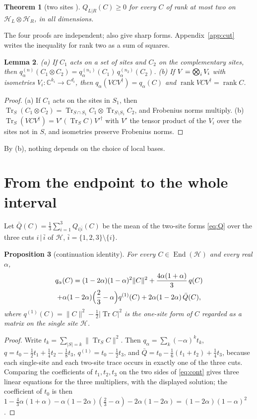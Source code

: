 \documentclass[aps,pra,twocolumn,superscriptaddress,nofootinbib,longbibliography]{revtex4-2}
\newcommand{\C}{\mathbb C}
\newcommand{\Hh}{\mathcal H}
\DeclareMathOperator{\Tr}{Tr}
\DeclareMathOperator{\rank}{rank}
\DeclareMathOperator{\End}{End}
\theoremstyle{plain}
\newtheorem{theorem}{Theorem}[section]
\newtheorem{lemma}[theorem]{Lemma}
\newtheorem{proposition}[theorem]{Proposition}
\theoremstyle{definition}
\theoremstyle{remark}
\begin{document}
\begin{theorem}[two sites \cite{FuGaoPark,SongChen,FHPV,BGH}]\label{thm:twocopy}
$Q_{L|R}(C)\ge0$ for every $C$ of rank at most two on $\Hh_L\otimes\Hh_R$, in all dimensions.
\end{theorem}

The four proofs are independent; \cite{FHPV,BGH} also give sharp forms. Appendix~\ref{app:cut} writes the inequality for rank two as a sum of squares.

\begin{lemma}\label{lem:elementary}
\textup{(a)} If $C_1$ acts on a set of sites and $C_2$ on the complementary sites, then $q^{(n)}_\alpha(C_1\otimes C_2)=q^{(n_1)}_\alpha(C_1)\,q^{(n_2)}_\alpha(C_2)$.
\textup{(b)} If $V=\bigotimes_{i\vphantom{y}}V_i$ with isometries $V_i:\C^{k_i}\to\C^{d_i}$, then $q_\alpha(VCV^\dagger)=q_\alpha(C)$ and $\rank VCV^\dagger=\rank C$.
\end{lemma}
\begin{proof}
(a) If $C_1$ acts on the sites in $S_1$, then $\Tr_S(C_1\otimes C_2)=\Tr_{S\cap S_1}C_1\otimes\Tr_{S\setminus S_1}C_2$, and Frobenius norms multiply. (b) $\Tr_S(VCV^\dagger)=V'(\Tr_SC)V'^\dagger$ with $V'$ the tensor product of the $V_i$ over the sites not in $S$, and isometries preserve Frobenius norms.
\end{proof}

By (b), nothing depends on the choice of local bases.

\section{From the endpoint to the whole interval}\label{sec:interval}

Let $\bar Q(C)=\tfrac13\sum_{i=1}^3Q_{i|\bar i}(C)$ be the mean of the two-site forms \eqref{eq:Q} over the three cuts $i\,|\,\bar i$ of $\Hh$, $\bar i=\{1,2,3\}\setminus\{i\}$.

\begin{proposition}[continuation identity]\label{prop:cont}
For every $C\in\End(\Hh)$ and every real $\alpha$,
\begin{multline}\label{eq:cont}
q_\alpha(C)=(1-2\alpha)(1-\alpha)^2\|C\|^2+\frac{4\alpha(1+\alpha)}3\,q(C)\\
+\alpha(1-2\alpha)\Bigl(\frac23-\alpha\Bigr)q^{(1)}(C)+2\alpha(1-2\alpha)\,\bar Q(C),
\end{multline}
where $q^{(1)}(C)=\|C\|^2-\tfrac12|\Tr C|^2$ is the one-site form of $C$ regarded as a matrix on the single site $\Hh$.
\end{proposition}
\begin{proof}
Write $t_k=\sum_{|S|=k}\|\Tr_SC\|^2$. Then $q_\alpha=\sum_k(-\alpha)^kt_k$, $q=t_0-\tfrac12t_1+\tfrac14t_2-\tfrac18t_3$, $q^{(1)}=t_0-\tfrac12t_3$, and $\bar Q=t_0-\tfrac16(t_1+t_2)+\tfrac14t_3$, because each single-site and each two-site trace occurs in exactly one of the three cuts. Comparing the coefficients of $t_1,t_2,t_3$ on the two sides of \eqref{eq:cont} gives three linear equations for the three multipliers, with the displayed solution; the coefficient of $t_0$ is then $1-\tfrac43\alpha(1+\alpha)-\alpha(1-2\alpha)(\tfrac23-\alpha)-2\alpha(1-2\alpha)=(1-2\alpha)(1-\alpha)^2$.
\end{proof}
\end{document}
